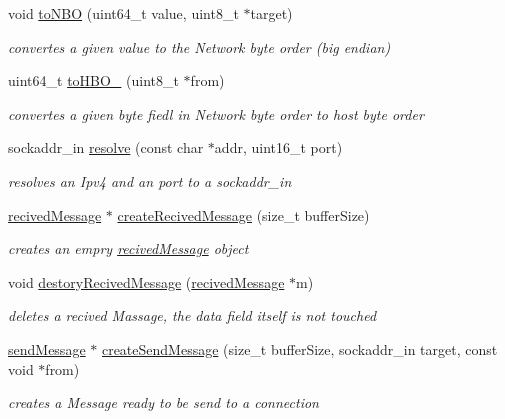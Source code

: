 \begin{DoxyCompactItemize}
void \hyperlink{namespacellu_1_1network_af0b046f65433995d5150c3f8251e7d07}{to\+N\+B\+O} (uint64\+\_\+t value, uint8\+\_\+t $\ast$target)
\begin{DoxyCompactList}\small\item\em convertes a given value to the Network byte order (big endian) \end{DoxyCompactList}\item 
uint64\+\_\+t \hyperlink{namespacellu_1_1network_af97d326c7853fc1b5932a56b8cc8e4b6}{to\+H\+B\+O\+\_} (uint8\+\_\+t $\ast$from)
\begin{DoxyCompactList}\small\item\em convertes a given byte fiedl in Network byte order to host byte order \end{DoxyCompactList}\item 
sockaddr\+\_\+in \hyperlink{namespacellu_1_1network_ae50fed51b566b947fd0cb1a4efbb3b12}{resolve} (const char $\ast$addr, uint16\+\_\+t port)
\begin{DoxyCompactList}\small\item\em resolves an Ipv4 and an port to a sockaddr\+\_\+in \end{DoxyCompactList}\item 
\hyperlink{structllu_1_1network_1_1recived_message}{recived\+Message} $\ast$ \hyperlink{namespacellu_1_1network_a867a402a3f2a945cf6d5f9b9c9ca4bd1}{create\+Recived\+Message} (size\+\_\+t buffer\+Size)
\begin{DoxyCompactList}\small\item\em creates an empry \hyperlink{structllu_1_1network_1_1recived_message}{recived\+Message} object \end{DoxyCompactList}\item 
void \hyperlink{namespacellu_1_1network_a957314727976f73a1566322ad0229ca8}{destory\+Recived\+Message} (\hyperlink{structllu_1_1network_1_1recived_message}{recived\+Message} $\ast$m)
\begin{DoxyCompactList}\small\item\em deletes a recived Massage, the data field itself is not touched \end{DoxyCompactList}\item 
\hyperlink{structllu_1_1network_1_1send_message}{send\+Message} $\ast$ \hyperlink{namespacellu_1_1network_a86501a24323e339aa0a3b4e935bb2495}{create\+Send\+Message} (size\+\_\+t buffer\+Size, sockaddr\+\_\+in target, const void $\ast$from)
\begin{DoxyCompactList}\small\item\em creates a Message ready to be send to a connection \end{DoxyCompactList}\item 

\end{DoxyCompactItemize}
